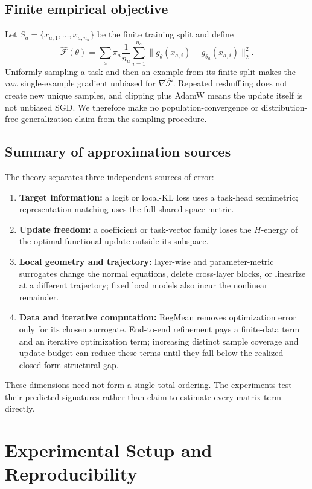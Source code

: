 \documentclass[letterpaper]{article} %
\theoremstyle{plain}
\theoremstyle{definition}
\begin{document}
\subsection{Finite empirical objective}
\label{app:finite-data}

Let $S_a=\{x_{a,1},\ldots,x_{a,n_a}\}$ be the finite training split and define \[ \widehat{\mathcal F}(\theta) =\sum_a\pi_a\frac1{n_a}\sum_{i=1}^{n_a} \|g_\theta(x_{a,i})-g_{\theta_a}(x_{a,i})\|_2^2.
\] Uniformly sampling a task and then an example from its finite split makes the \emph{raw} single-example gradient unbiased for $\nabla\widehat{\mathcal F}$.
Repeated reshuffling does not create new unique samples, and clipping plus AdamW means the update itself is not unbiased SGD.
We therefore make no population-convergence or distribution-free generalization claim from the sampling procedure.

\subsection{Summary of approximation sources}
\label{app:theory-summary}

The theory separates three independent sources of error:
\begin{enumerate}
    \item \textbf{Target information:} a logit or local-KL loss uses a task-head
semimetric; representation matching uses the full shared-space metric.
    \item \textbf{Update freedom:} a coefficient or task-vector family loses the
$H$-energy of the optimal functional update outside its subspace.
    \item \textbf{Local geometry and trajectory:} layer-wise and parameter-metric
surrogates change the normal equations, delete cross-layer blocks, or linearize at a different trajectory; fixed local models also incur the nonlinear remainder.
    \item \textbf{Data and iterative computation:} RegMean removes optimization error only
for its chosen surrogate.
End-to-end refinement pays a finite-data term and an iterative optimization term; increasing distinct sample coverage and update budget can reduce these terms until they fall below the realized closed-form structural gap.
\end{enumerate}
These dimensions need not form a single total ordering.
The experiments test their predicted signatures rather than claim to estimate every matrix term directly.
\section{Experimental Setup and Reproducibility}
\label{app:setup}
\end{document}
